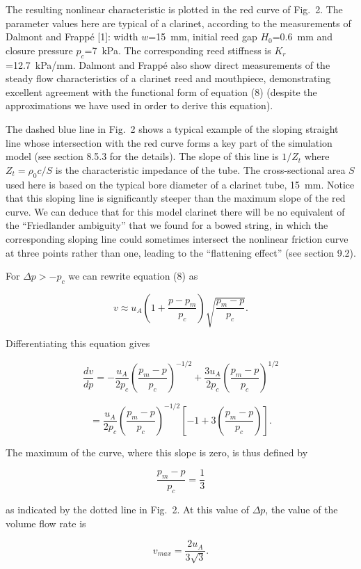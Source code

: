   The resulting nonlinear characteristic is plotted in the red curve of Fig.\ 
  2. The parameter values here are typical of a clarinet, according to the 
  measurements of Dalmont and Frappé [1]: width $w$=15~mm, initial reed gap 
  $H_0$=0.6~mm and closure pressure $p_c$=7~kPa. The corresponding reed 
  stiffness is $K_r$=12.7~kPa/mm. Dalmont and Frappé also show direct 
  measurements of the steady flow characteristics of a clarinet reed and 
  mouthpiece, demonstrating excellent agreement with the functional form of 
  equation (8) (despite the approximations we have used in order to derive this 
  equation). 

  The dashed blue line in Fig.\ 2 shows a typical example of the sloping 
  straight line whose intersection with the red curve forms a key part of the 
  simulation model (see section 8.5.3 for the details). The slope of this line 
  is $1/Z_t$ where $Z_t=\rho_0 c/S$ is the characteristic impedance of the 
  tube. The cross-sectional area $S$ used here is based on the typical bore 
  diameter of a clarinet tube, 15~mm. Notice that this sloping line is 
  significantly steeper than the maximum slope of the red curve. We can deduce 
  that for this model clarinet there will be no equivalent of the ``Friedlander 
  ambiguity'' that we found for a bowed string, in which the corresponding 
  sloping line could sometimes intersect the nonlinear friction curve at three 
  points rather than one, leading to the ``flattening effect'' (see section 
  9.2). 

  For $\Delta p > -p_c$ we can rewrite equation (8) as 

  $$v \approx u_A\left(1+ \dfrac{p-p_m}{p_c}\right) \sqrt{\dfrac{p_m-p}{p_c}} 
  .\tag{10}$$ 

  Differentiating this equation gives 

  $$\dfrac{dv}{dp}= -\dfrac{u_A}{2p_c} \left(\dfrac{p_m-p}{p_c}\right)^{-1/2} 
  +\dfrac{3u_A}{2p_c} \left(\dfrac{p_m-p}{p_c}\right)^{1/2}$$ 

  $$=\dfrac{u_A}{2p_c} \left(\dfrac{p_m-p}{p_c}\right)^{-1/2} \left[-1 + 
  3\left( \dfrac{p_m-p}{p_c} \right) \right] . \tag{11}$$ 

  The maximum of the curve, where this slope is zero, is thus defined by 

  $$\dfrac{p_m-p}{p_c}=\dfrac{1}{3} \tag{12}$$ 

  as indicated by the dotted line in Fig.\ 2. At this value of $\Delta p$, the 
  value of the volume flow rate is 

  $$v_{max}=\dfrac{2u_A}{3 \sqrt{3}} . \tag{13}$$ 

